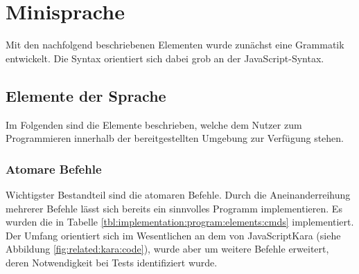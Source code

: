 \section{Minisprache}
\label{sec:implementation:program}

Mit den nachfolgend beschriebenen Elementen wurde zunächst eine Grammatik entwickelt. Die Syntax orientiert sich dabei grob an der JavaScript-Syntax.

\subsection{Elemente der Sprache}
\label{sec:implementation:program:elements}

Im Folgenden sind die Elemente beschrieben, welche dem Nutzer zum Programmieren innerhalb der bereitgestellten Umgebung zur Verfügung stehen.

\subsubsection{Atomare Befehle}
\label{sec:implementation:program:elements:cmds}

Wichtigster Bestandteil sind die atomaren Befehle. Durch die Aneinanderreihung mehrerer Befehle lässt sich bereits ein sinnvolles Programm implementieren. Es wurden die in Tabelle \ref{tbl:implementation:program:elements:cmds} implementiert. Der Umfang orientiert sich im Wesentlichen an dem von JavaScriptKara (siehe Abbildung \ref{fig:related:kara:code}), wurde aber um weitere Befehle erweitert, deren Notwendigkeit bei Tests identifiziert wurde.

